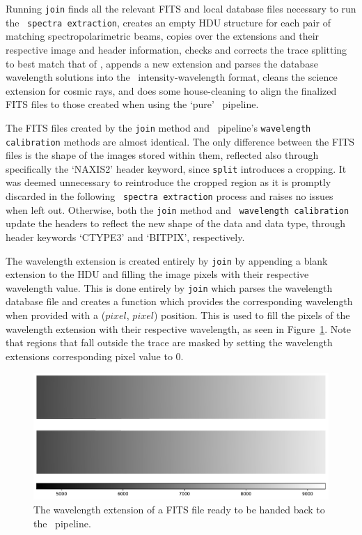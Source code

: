 Running \texttt{join} finds all the relevant \gls{FITS} and local database files necessary to run the \polsalt\ \texttt{spectra extraction}, creates an empty \gls{HDU} structure for each pair of matching spectropolarimetric beams, copies over the extensions and their respective image and header information, checks and corrects the trace splitting to best match that of \polsalt, appends a new extension and parses the database wavelength solutions into the \polsalt\ intensity-wavelength format, cleans the science extension for cosmic rays, and does some house-cleaning to align the finalized \gls{FITS} files to those created when using the `pure' \polsalt\ pipeline.
\prgph

The \gls{FITS} files created by the \texttt{join} method and \polsalt\ pipeline's \texttt{wavelength calibration} methods are almost identical. The only difference between the \gls{FITS} files is the shape of the images stored within them, reflected also through specifically the `NAXIS2' header keyword, since \texttt{split} introduces a cropping. It was deemed unnecessary to reintroduce the cropped region as it is promptly discarded in the following \polsalt\ \texttt{spectra extraction} process and raises no issues when left out. Otherwise, both the \texttt{join} method and \polsalt\ \texttt{wavelength calibration} update the headers to reflect the new shape of the data and data type, through header keywords `CTYPE3' and `BITPIX', respectively.
\prgph

The wavelength extension is created entirely by \texttt{join} by appending a blank extension to the \gls{HDU} and filling the image pixels with their respective wavelength value. This is done entirely by \texttt{join} which parses the wavelength database file and creates a function which provides the corresponding wavelength when provided with a ($pixel$, $pixel$) position. This is used to fill the pixels of the wavelength extension with their respective wavelength, as seen in Figure~\ref{fig:pol_wav_ext}. Note that regions that fall outside the trace are masked by setting the wavelength extensions corresponding pixel value to $0$.
\prgph

\begin{figure}[t]
    \centering
    \includegraphics[width = 1.0\textwidth]{figures/3_pol_wav_ext.pdf}
    \caption{The wavelength extension of a \gls{FITS} file ready to be handed back to the \polsalt\ pipeline.}
    \label{fig:pol_wav_ext}
\end{figure}

